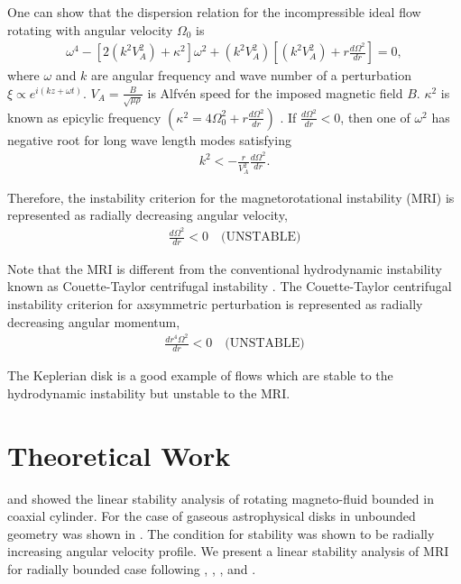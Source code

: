 \documentclass{jfm}
\begin{document}
One can show that the dispersion relation for the incompressible ideal flow rotating with angular velocity $\Omega_0$ is
\begin{align}
    \omega^4-\left[2\left(k^2 V_A^2\right) +\kappa^2\right]\omega^2 +\left(k^2 V_A^2\right)\left[\left(k^2 V_A^2\right)+r\frac{d \Omega^2}{dr}\right]=0,
\end{align}
where $\omega$ and $k$ are angular frequency and wave number of a perturbation $\xi \propto e^{i(k z+\omega t)}$. $V_A=\frac{B}{\sqrt{\mu \rho}}$ is Alfv\'en speed for the imposed magnetic field $B$. $\kappa^2$ is known as epicylic frequency $\left(\kappa^2=4\Omega_0^2 + r \frac{d \Omega^2}{dr}\right)$ \citep[see][]{Balbus1991,Balbus1998,Balbus2003}. If $\frac{d \Omega^2}{dr}<0$, then one of $\omega^2$ has negative root for long wave length modes satisfying
\begin{align}
    k^2 < -\frac{r}{V_A^2}\frac{d\Omega^2}{dr}.
\end{align}

Therefore, the instability criterion for the magnetorotational instability (MRI) is represented as radially decreasing angular velocity,
\begin{align}
    \frac{d \Omega^2}{dr}<0 \quad \text{(UNSTABLE)}
\end{align} 

Note that the MRI is different from the conventional hydrodynamic instability known as Couette-Taylor centrifugal instability \cite[see][]{Charru2011}. The Couette-Taylor centrifugal instability criterion for axsymmetric perturbation is represented as radially decreasing angular momentum,
\begin{align}
    \frac{d r^4 \Omega^2}{dr} <0 \quad \text{(UNSTABLE)}
\end{align}

The Keplerian disk is a good example of flows which are stable to the hydrodynamic instability but unstable to the MRI.



\section{Theoretical Work}
\label{sec:theory}

\cite{Acheson1973} and \cite{Knobloch1992} showed the linear stability analysis
of rotating magneto-fluid bounded in coaxial cylinder. For the case of gaseous 
astrophysical disks in unbounded geometry was shown in \cite{Balbus1991}. The 
condition for stability was shown to be radially increasing angular velocity 
profile. We present a linear stability analysis of MRI for radially bounded case 
following \cite{Acheson1972}, \cite{Acheson1973a}, \cite{Knobloch1992}, and 
\cite{Julien2010}.
\end{document}
